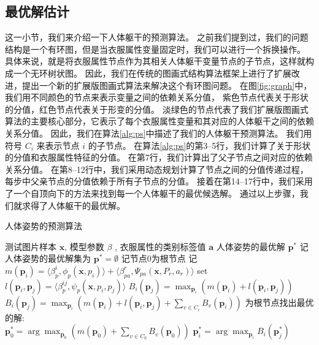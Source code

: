 \subsection{最优解估计}
这一小节，我们来介绍一下人体躯干的预测算法。
之前我们提到过，我们的问题结构是一个有环图，但是当衣服属性变量固定时，我们可以进行一个拆换操作。
具体来说，就是将衣服属性节点作为其相关人体躯干变量节点的子节点，这样就构成一个无环树状图。
因此，我们在传统的图画式结构算法框架上进行了扩展改进，提出一个新的扩展版图画式算法来解决这个有环图问题。
在图\ref{fig:graph}中，我们用不同颜色的节点来表示变量之间的依赖关系分值，
紫色节点代表关于形状的分值，红色节点代表关于形变的分值。
淡绿色的节点代表了我们扩展版图画式算法的主要核心部分，它表示了每个衣服属性变量和其对应的人体躯干之间的依赖关系分值。
因此，我们在算法\ref{alg:ps}中描述了我们的人体躯干预测算法。
我们用符号 $C_i$ 来表示节点 $i$ 的子节点。
在算法\ref{alg:ps}的第3--5行，我们计算了关于形状的分值和衣服属性特征的分值。
在第7行，我们计算出了父子节点之间对应的依赖关系分值。
在第8--12行中，我们采用动态规划计算了节点之间的分值传递过程，每步中父亲节点的分值依赖于所有子节点的分值。
接着在第14--17行中，我们采用了一个自顶向下的方法来找到每一个人体躯干的最优候选解。
通过以上步骤，我们就求得了人体躯干的最优解。

\begin{algorithm}
\caption{人体姿势的预测算法}
\begin{algorithmic}[1]
    \REQUIRE 测试图片样本 $\mathbf{x}$, 模型参数 $\beta$ ,  衣服属性的类别标签值 $\mathbf{a}$
    \ENSURE 人体姿势的最优解 $\mathbf{p^*}$
    \STATE 记人体姿势的最优解集为 $\mathbf{p^*} = \emptyset$
    \STATE 记节点0为根节点
        \STATE 记 $m(\mathbf{p}_i) = \langle \beta_p^i, \phi_p(\mathbf{x}, p_i) \rangle + \langle \beta_{pa}^r, \Psi_{pa}(\mathbf{x}, P_r, a_r) \rangle$
    \ENDFOR
        \STATE set $l(\mathbf{p}_i, \mathbf{p}_j) = \langle \beta_p^{ij}, \psi_p(\mathbf{x}, p_i, p_j) \rangle$
            \STATE $B_i(\mathbf{p}_j) = \max_{\mathbf{p}_i} (m(\mathbf{p}_i) + l(\mathbf{p}_i, \mathbf{p}_j) )$
        \ELSE
            \STATE $B_i(\mathbf{p}_j) = \max_{\mathbf{p}_i} (m(\mathbf{p}_i) + l(\mathbf{p}_i, \mathbf{p}_j) + \sum_{v \in C_i} B_v(\mathbf{p}_i) )$
        \ENDIF
    \ENDFOR
    \STATE 为根节点找出最优的解: \\
        $\mathbf{p}_0^* = \arg \max_{\mathbf{p}_0} ( m(\mathbf{p}_0) + \sum_{v \in C_0} B_v(\mathbf{p}_0) )$
        \STATE $\mathbf{p}_i^* = \arg \max_{\mathbf{p}_i} B_i(\mathbf{p}_j^*)$
    \ENDFOR
\end{algorithmic}
\label{alg:ps}
\end{algorithm}

